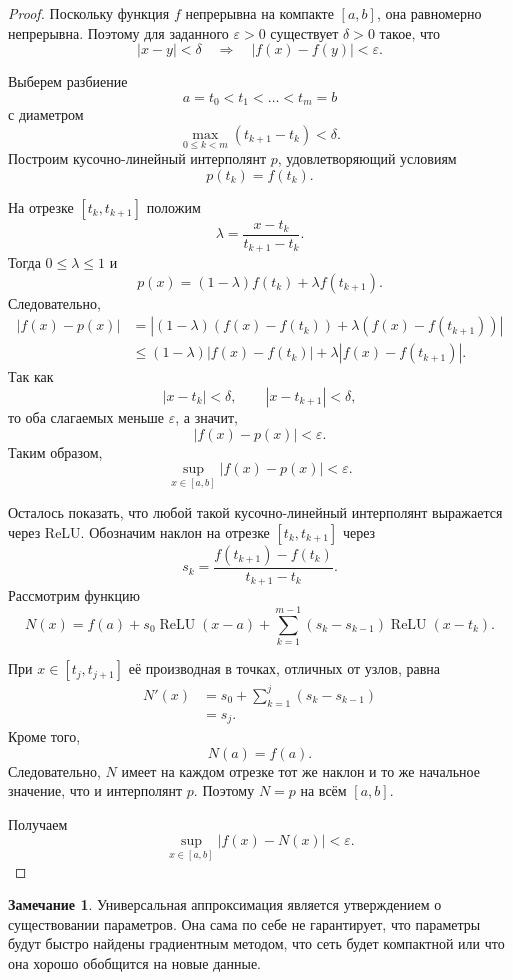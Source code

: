 \documentclass[12pt,a4paper]{article}
\theoremstyle{definition}
\newtheorem{remark}[theorem]{Замечание}
\newcommand{\1}{\mathbf{1}}
\newcommand{\eps}{\varepsilon}
\DeclareMathOperator{\ReLU}{ReLU}
\begin{document}
\begin{proof}
Поскольку функция $f$ непрерывна на компакте $[a,b]$, она равномерно
непрерывна. Поэтому для заданного $\eps>0$ существует $\delta>0$ такое,
что
\[
    |x-y|<\delta
    \quad\Longrightarrow\quad
    |f(x)-f(y)|<\eps.
\]

Выберем разбиение
\[
    a=t_0<t_1<\dots<t_m=b
\]
с диаметром
\[
    \max_{0\leq k<m}(t_{k+1}-t_k)<\delta.
\]
Построим кусочно-линейный интерполянт $p$, удовлетворяющий условиям
\[
    p(t_k)=f(t_k).
\]

На отрезке $[t_k,t_{k+1}]$ положим
\[
    \lambda
    =
    \frac{x-t_k}{t_{k+1}-t_k}.
\]
Тогда $0\leq\lambda\leq1$ и
\[
    p(x)
    =
    (1-\lambda)f(t_k)+\lambda f(t_{k+1}).
\]
Следовательно,
\begin{align*}
    |f(x)-p(x)|
    &=
    \left|
        (1-\lambda)(f(x)-f(t_k))
        +
        \lambda(f(x)-f(t_{k+1}))
    \right|\\
    &\leq
    (1-\lambda)|f(x)-f(t_k)|
    +
    \lambda|f(x)-f(t_{k+1})|.
\end{align*}
Так как
\[
    |x-t_k|<\delta,
    \qquad
    |x-t_{k+1}|<\delta,
\]
то оба слагаемых меньше $\eps$, а значит,
\[
    |f(x)-p(x)|<\eps.
\]
Таким образом,
\[
    \sup_{x\in[a,b]}|f(x)-p(x)|<\eps.
\]

Осталось показать, что любой такой кусочно-линейный интерполянт
выражается через ReLU. Обозначим наклон на отрезке
$[t_k,t_{k+1}]$ через
\[
    s_k
    =
    \frac{f(t_{k+1})-f(t_k)}{t_{k+1}-t_k}.
\]
Рассмотрим функцию
\[
    N(x)
    =
    f(a)
    +
    s_0\ReLU(x-a)
    +
    \sum_{k=1}^{m-1}
        (s_k-s_{k-1})\ReLU(x-t_k).
\]

При $x\in[t_j,t_{j+1}]$ её производная в точках, отличных от узлов,
равна
\begin{align*}
    N'(x)
    &=
    s_0+
    \sum_{k=1}^{j}(s_k-s_{k-1})\\
    &=
    s_j.
\end{align*}
Кроме того,
\[
    N(a)=f(a).
\]
Следовательно, $N$ имеет на каждом отрезке тот же наклон и то же
начальное значение, что и интерполянт $p$. Поэтому $N=p$ на всём
$[a,b]$.

Получаем
\[
    \sup_{x\in[a,b]}|f(x)-N(x)|<\eps.
\]
\end{proof}

\begin{remark}
Универсальная аппроксимация является утверждением о существовании
параметров. Она сама по себе не гарантирует, что параметры будут
быстро найдены градиентным методом, что сеть будет компактной или
что она хорошо обобщится на новые данные.
\end{remark}
\end{document}
